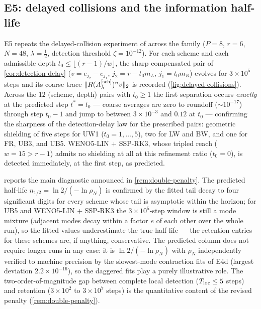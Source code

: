 \documentclass[pdflatex,sn-mathphys-num]{sn-jnl}%
\theoremstyle{thmstyleone}%
\theoremstyle{thmstyletwo}%
\theoremstyle{thmstylethree}%
\newcommand{\Asch}{A^{[\rm sch]}_\lambda}
\begin{document}
\subsection{E5: delayed collisions and the information half-life}\label{sec:exp-collisions}

E5 repeats the delayed-collision experiment of \cite{PolemitisChristakisDrikakis2026FVerasure} across the family ($P=8$, $r=6$, $N=48$, $\lambda=\tfrac12$, detection threshold $\zeta=10^{-12}$).
For each scheme and each admissible depth $t_0\le\lfloor(r-1)/w\rfloor$, the sharp compensated pair of \cref{cor:detection-delay} ($v=e_{j_2}-e_{j_1}$, $j_2=r-t_0m_L$, $j_1=t_0m_R$) evolves for $3\times10^5$ steps and its coarse trace $\|R(\Asch)^nv\|_2$ is recorded (\cref{fig:delayed-collisions}).
Across the $12$ (scheme, depth) pairs with $t_0\ge1$ the first separation occurs \emph{exactly} at the predicted step $t^\ast=t_0$ --- coarse averages are zero to roundoff ($\sim10^{-17}$) through step $t_0-1$ and jump to between $3\times10^{-3}$ and $0.12$ at $t_0$ --- confirming the sharpness of the detection-delay law for the prescribed pairs: geometric shielding of five steps for UW1 ($t_0=1,\ldots,5$), two for LW and BW, and one for FR, UB3, and UB5.
WENO5-LIN + SSP-RK3, whose tripled reach ($w=15>r-1$) admits no shielding at all at this refinement ratio ($t_0=0$), is detected immediately, at the first step, as predicted.

 reports the main diagnostic announced in \cref{rem:double-penalty}.
The predicted half-life $n_{1/2}=\ln2/(-\ln\rho_N)$ is confirmed by the fitted tail decay to four significant digits for every scheme whose tail is asymptotic within the horizon; for UB5 and WENO5-LIN + SSP-RK3 the $3\times10^5$-step window is still a mode mixture (adjacent modes decay within a factor $e$ of each other over the whole run), so the fitted values underestimate the true half-life --- the retention entries for these schemes are, if anything, conservative.
The predicted column does not require longer runs in any case: it is $\ln2/(-\ln\rho_N)$ with $\rho_N$ independently verified to machine precision by the slowest-mode contraction fits of E4d (largest deviation $2.2\times10^{-16}$), so the daggered fits play a purely illustrative role.
The two-order-of-magnitude gap between complete local detection ($T_{\rm loc}\le5$ steps) and retention ($3\times10^2$ to $3\times10^7$ steps) is the quantitative content of the revised penalty (\cref{rem:double-penalty}).
\end{document}
